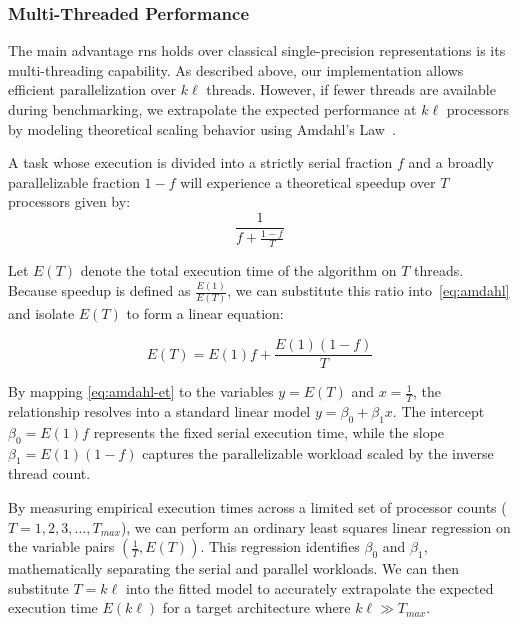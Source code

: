 \newpage
\subsubsection{Multi-Threaded Performance}
\label{sec:amdahl}
The main advantage \gls{rns} holds over classical single-precision representations is its multi-threading capability. As described above, our implementation allows efficient parallelization over $k\ell$ threads. However, if fewer threads are available during benchmarking, we extrapolate the expected performance at $k\ell$ processors by modeling theoretical scaling behavior using Amdahl's Law~\cite{Gustafson:2011}.

\begin{definition}
    A task whose execution is divided into a strictly serial fraction $f$ and a broadly parallelizable fraction $1-f$ will experience a theoretical speedup over $T$ processors given by:
    \begin{equation}
        \label{eq:amdahl}
        \frac{1}{f + \frac{1-f}{T}}
    \end{equation}
\end{definition}

Let $E(T)$ denote the total execution time of the algorithm on $T$ threads. Because speedup is defined as $\frac{E(1)}{E(T)}$, we can substitute this ratio into~\eqref{eq:amdahl} and isolate $E(T)$ to form a linear equation:

\begin{equation}
    \label{eq:amdahl-et}
    E(T) = E(1)f + \frac{E(1)(1-f)}{T}
\end{equation}

By mapping \eqref{eq:amdahl-et} to the variables $y = E(T)$ and $x = \frac{1}{T}$, the relationship resolves into a standard linear model $y = \beta_0 + \beta_1 x$. The intercept $\beta_0 = E(1)f$ represents the fixed serial execution time, while the slope $\beta_1 = E(1)(1-f)$ captures the parallelizable workload scaled by the inverse thread count.

By measuring empirical execution times across a limited set of processor counts ($T = 1, 2, 3, \dots, T_{max}$), we can perform an ordinary least squares linear regression on the variable pairs $(\frac{1}{T}, E(T))$. This regression identifies $\beta_0$ and $\beta_1$, mathematically separating the serial and parallel workloads. We can then substitute $T = k\ell$ into the fitted model to accurately extrapolate the expected execution time $E(k\ell)$ for a target architecture where $k\ell \gg T_{max}$.

